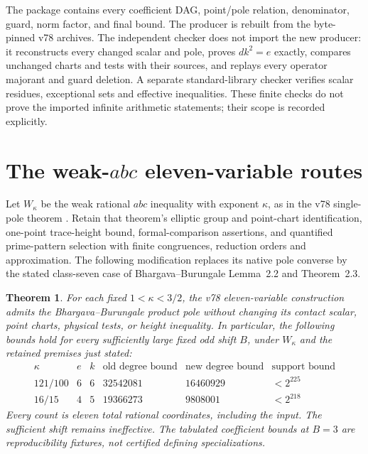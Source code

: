 \documentclass[11pt]{article}
\newtheorem{theorem}{Theorem}
\begin{document}
The package  contains every
coefficient DAG, point/pole relation, denominator, guard, norm factor,
and final bound. The producer is rebuilt from the byte-pinned v78
archives. The independent checker does not import the new producer:
it reconstructs every changed scalar and pole, proves $dk^2=e$ exactly,
compares unchanged charts and tests with their sources, and replays
every operator majorant and guard deletion. A separate standard-library
checker verifies scalar residues, exceptional sets and effective
inequalities. These finite checks do not prove the imported infinite
arithmetic statements; their scope is recorded explicitly.

\section{The weak-$abc$ eleven-variable routes}
\label{sec:weak-bb}
Let $W_\kappa$ be the weak rational $abc$ inequality with exponent
$\kappa$, as in the v78 single-pole theorem \cite{weak}. Retain that theorem's
elliptic group and point-chart identification, one-point trace-height
bound, formal-comparison assertions, and quantified prime-pattern
selection with finite congruences, reduction orders and approximation.
The following modification replaces its native pole converse by the
stated class-seven case of Bhargava--Burungale Lemma~2.2 and Theorem~2.3.

\begin{theorem}
For each fixed $1<\kappa<3/2$, the v78 eleven-variable construction
admits the Bhargava--Burungale product pole without changing its contact
scalar, point charts, physical tests, or height inequality. In particular,
the following bounds hold for every sufficiently large fixed odd shift
$B$, under $W_\kappa$ and the retained premises just stated:
\[
\begin{array}{c|c|c|r|r|r}
\kappa&e&k&\text{old degree bound}&\text{new degree bound}&
\text{support bound}\\\hline
121/100&6&6&32542081&16460929&<2^{225}\\
16/15&4&5&19366273&9808001&<2^{218}
\end{array}
\]
Every count is eleven total rational coordinates, including the input.
The sufficient shift remains ineffective. The tabulated coefficient
bounds at $B=3$ are reproducibility fixtures, not certified defining
specializations.
\end{theorem}
\end{document}
